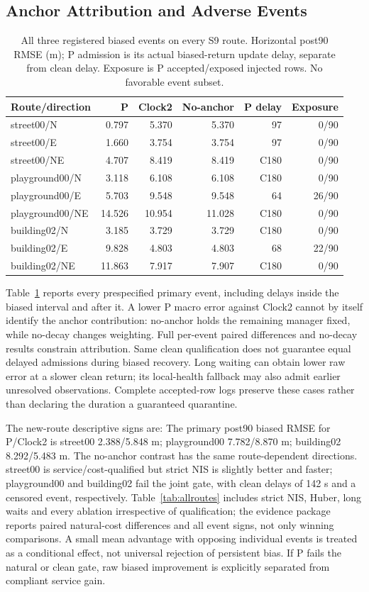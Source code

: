 \documentclass[conference]{IEEEtran}
\begin{document}
\subsection{Anchor Attribution and Adverse Events}
\begin{table}[t]\centering\scriptsize
\caption{All three registered biased events on every S9 route. Horizontal post90 RMSE (m); P admission is its actual biased-return update delay, separate from clean delay. Exposure is P accepted/exposed injected rows. No favorable event subset.}\label{tab:events}
\begin{tabular}{lrrrrr}\toprule
Route/direction & P & Clock2 & No-anchor & P delay & Exposure\\\midrule
street00/N & 0.797 & 5.370 & 5.370 & 97 & 0/90 \\
street00/E & 1.660 & 3.754 & 3.754 & 97 & 0/90 \\
street00/NE & 4.707 & 8.419 & 8.419 & C180 & 0/90 \\
playground00/N & 3.118 & 6.108 & 6.108 & C180 & 0/90 \\
playground00/E & 5.703 & 9.548 & 9.548 & 64 & 26/90 \\
playground00/NE & 14.526 & 10.954 & 11.028 & C180 & 0/90 \\
building02/N & 3.185 & 3.729 & 3.729 & C180 & 0/90 \\
building02/E & 9.828 & 4.803 & 4.803 & 68 & 22/90 \\
building02/NE & 11.863 & 7.917 & 7.907 & C180 & 0/90 \\
\bottomrule\end{tabular}\end{table}
Table~\ref{tab:events} reports every prespecified primary event, including delays inside the biased interval and after it. A lower P macro error against Clock2 cannot by itself identify the anchor contribution: no-anchor holds the remaining manager fixed, while no-decay changes weighting. Full per-event paired differences and no-decay results constrain attribution. Same clean qualification does not guarantee equal delayed admissions during biased recovery. Long waiting can obtain lower raw error at a slower clean return; its local-health fallback may also admit earlier unresolved observations. Complete accepted-row logs preserve these cases rather than declaring the duration a guaranteed quarantine.

The new-route descriptive signs are: The primary post90 biased RMSE for P/Clock2 is street00 2.388/5.848 m; playground00 7.782/8.870 m; building02 8.292/5.483 m. The no-anchor contrast has the same route-dependent directions. street00 is service/cost-qualified but strict NIS is slightly better and faster; playground00 and building02 fail the joint gate, with clean delays of 142 s and a censored event, respectively. Table~\ref{tab:allroutes} includes strict NIS, Huber, long waits and every ablation irrespective of qualification; the evidence package reports paired natural-cost differences and all event signs, not only winning comparisons. A small mean advantage with opposing individual events is treated as a conditional effect, not universal rejection of persistent bias. If P fails the natural or clean gate, raw biased improvement is explicitly separated from compliant service gain.
\end{document}
